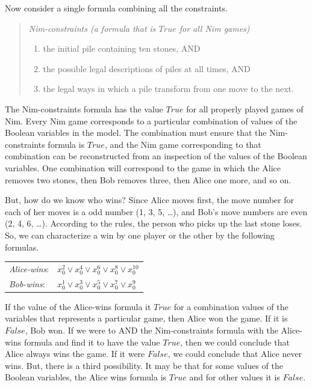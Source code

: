 {{Now consider a single formula combining all the constraints.
\begin{quote}
\begin{center}
\emph{Nim-constraints (a formula that is $True$ for all Nim games)}
\end{center}
\begin{enumerate}
\item the initial pile containing ten stones, AND
\item the possible legal descriptions of piles at all times, AND
\item the legal ways in which a pile transform from one move to the next.
\end{enumerate}
\end{quote}

The Nim-constraints formula has the value $True$ for all properly played games of Nim.
Every Nim game corresponds to a particular combination of values of
the Boolean variables in the model.
The combination must ensure that the Nim-constraints formula is $True$, and
the Nim game corresponding to that combination can be reconstructed
from an inspection of the values of the Boolean variables.
One combination will correspond to the game in which the Alice removes two stones,
then Bob removes three, then Alice one more, and so on.

But, how do we know who wins?
Since Alice moves first, the move number for each of her moves is a odd number (1, 3, 5, \dots),
and Bob's move numbers are even (2, 4, 6, \dots).
According to the rules, the person who picks up the last stone loses.
So, we can characterize a win by one player or the other by
the following formulas.
\begin{center}
\label{alice-wins-formula}
\begin{tabular} {ll}
\emph{Alice-wins}: & $x_{0}^{2} \vee x_{0}^{4} \vee x_{0}^{6} \vee x_{0}^{8} \vee x_{0}^{10}$ \\
\emph{Bob-wins}:   & $x_{0}^{1} \vee x_{0}^{3} \vee x_{0}^{5} \vee x_{0}^{7} \vee x_{0}^{9}$  \\
\end{tabular}
\end{center}

If the value of the Alice-wins formula it $True$
for a combination values of the variables that represents a particular game,
then Alice won the game. If it is $False$, Bob won.
If we were to AND the Nim-constraints formula with the Alice-wins formula
and find it to have the value $True$, then we could conclude that Alice always wins the game.
If it were $False$, we could conclude that Alice never wins.
But, there is a third possibility.
It may be that for some values of the Boolean variables,
the Alice wins formula is $True$
and for other values it is $False$.

}}
